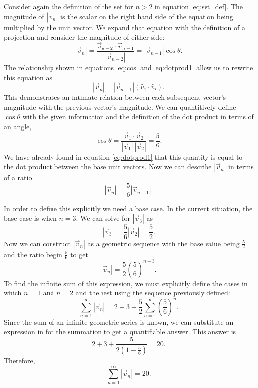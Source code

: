 \documentclass{article}
\begin{document}
Consider again the definition of the set for $n>2$ in equation \ref{eq:set_def}. The magnitude of $|\vec{v}_n|$ is the scalar on the right hand side of the equation being multiplied by the unit vector. We expand that equation with the definition of a projection and consider the magnitude of either side:
\[
    |\vec{v}_n|=\frac{\vec{v}_{n-2} \cdot \vec{v}_{n-1}}{|\vec{v}_{n-2}|}=|\vec{v}_{n-1}|\cos\theta.
\]
The relationship shown in equations \ref{eq:cos} and \ref{eq:dotprod1} allow us to rewrite this equation as
\[
    |\vec{v}_n|=|\vec{v}_{n-1}|(\hat{v}_1 \cdot \hat{v}_2).
\] 
This demonstrates an intimate relation between each subsequent vector's magnitude with the previous vector's magnitude. We can quantitively define $\cos\theta$ with the given information and the definition of the dot product in terms of an angle,
\[
    \cos\theta=\frac{\vec{v}_1\cdot\vec{v}_2}{|\vec{v}_1|\:|\vec{v}_2|}=\frac{5}{6}.
\]
We have already found in equation \ref{eq:dotprod1} that this quantity is equal to the dot product between the base unit vectors. Now we can describe $|\vec{v}_n|$ in terms of a ratio
\[
    |\vec{v}_n|=\frac{5}{6}|\vec{v}_{n-1}|.
\]

In order to define this explicitly we need a base case. In the current situation, the base case is when $n=3$. We can solve for $|\vec{v}_3|$ as
\[
    |\vec{v}_3|=\frac{5}{6}|\vec{v}_2|=\frac{5}{2}.
\]
Now we can construct $|\vec{v}_n|$ as a geometric sequence with the base value being $\frac{5}{2}$ and the ratio begin $\frac{5}{6}$ to get
\[
    |\vec{v}_n|=\frac{5}{2}\left(\frac{5}{6}\right)^{n-3}. %
\]
To find the infinite sum of this expression, we must explicitly define the cases in which $n=1$ and $n=2$ and the rest using the sequence previously defined:
\[
    \sum_{n=1}^\infty |\vec{v}_n|=2+3+\frac{5}{2}\sum_{n=0}^\infty \left(\frac{5}{6}\right)^n.
\]
Since the sum of an infinite geometric series is known, we can substitute an expression in for the summation to get a quantifiable answer. This answer is
\[
    2+3+\frac{5}{2\left(1-\frac{5}{6}\right)}=20.
\]  
Therefore,
\[
    \sum_{n=1}^\infty |\vec{v}_n|=20.
\]
\end{document}

